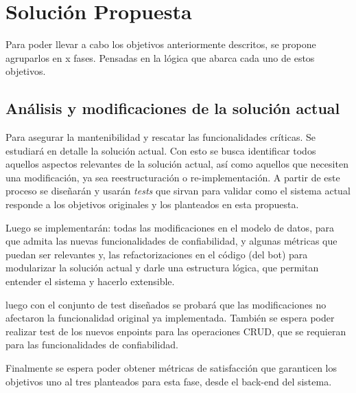 \documentclass[guia]{upropuesta}
\begin{document}
          
          

\newpage
\section{Solución Propuesta}\label{sec:sol}
    \par Para poder llevar a cabo los objetivos anteriormente descritos, se propone agruparlos en x fases. Pensadas en la lógica que abarca cada uno de estos objetivos. 
    
    \subsection{Análisis y modificaciones de la solución actual}
    \par Para asegurar la mantenibilidad y rescatar las funcionalidades críticas. Se estudiará en detalle la solución actual. Con esto se busca identificar todos aquellos aspectos relevantes de la solución actual, así como aquellos que necesiten una modificación, ya sea reestructuración o re-implementación. A partir de este proceso se diseñarán y usarán \textit{tests} que sirvan para validar como el sistema actual responde a los objetivos originales y los planteados en esta propuesta.
    \par Luego se implementarán: todas las modificaciones en el modelo de datos, para que admita las nuevas funcionalidades de confiabilidad, y algunas métricas que puedan ser relevantes y, las refactorizaciones en el código (del bot) para modularizar la solución actual y darle una estructura lógica, que permitan entender el sistema y hacerlo extensible.
    \par luego con el conjunto de test diseñados se probará que las modificaciones no afectaron la funcionalidad original ya implementada. También se espera poder realizar test de los nuevos enpoints para las operaciones CRUD, que se requieran para las funcionalidades de confiabilidad.
    \par Finalmente se espera poder obtener métricas de satisfacción que garanticen los objetivos uno al tres planteados para esta fase, desde el back-end del sistema.
    
\end{document}
